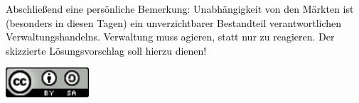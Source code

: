 \documentclass[a4paper]{article}
\begin{document}
\bigskip


\bigskip

{
\textcolor{black}{Abschlie{\ss}end eine pers\"onliche Bemerkung:
Unabh\"angigkeit von den M\"arkten ist (besonders in diesen Tagen) ein
unverzichtbarer Bestandteil verantwortlichen Verwaltungshandelns.
Verwaltung muss agieren, statt nur zu reagieren. Der skizzierte
L\"osungsvorschlag soll hierzu dienen!}}



\bigskip


\bigskip

{\centering 
\includegraphics[width=1.222in,height=0.4307in]{freiesoftwaredortmund-img3.png}
\par}


\bigskip
\end{document}
